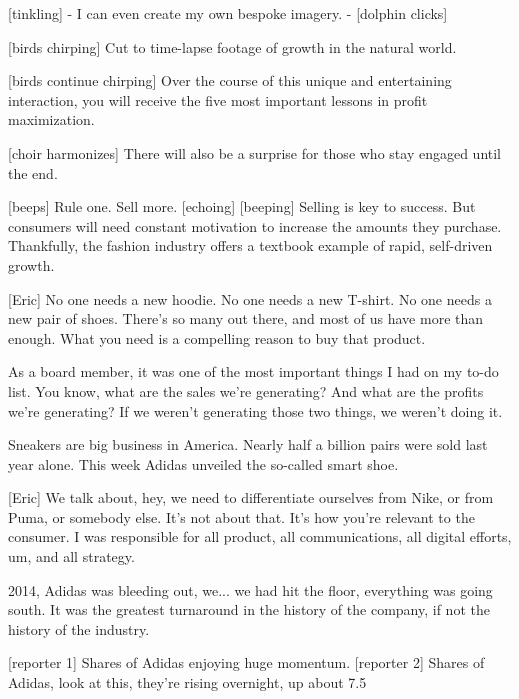 \documentclass[a4paper]{article}
\begin{document}
	
	
	
	
	[tinkling]
	- I can even create my own bespoke imagery. 
	- [dolphin clicks]
	
	
	[birds chirping]
	Cut to time-lapse footage of growth in the natural world.
	
	
	[birds continue chirping]
	Over the course of this unique and entertaining interaction, you will receive the five most important lessons in profit maximization.
	
	
	
	[choir harmonizes]
	There will also be a surprise for those who stay engaged until the end.
	
	
	
	[beeps]
	Rule one.
	Sell more. [echoing]
	[beeping]
	Selling is key to success. But consumers will need constant motivation to increase the amounts they purchase.
	Thankfully, the fashion industry offers a textbook example of rapid, self-driven growth.
	
	
	
	
	[Eric] No one needs a new hoodie. No one needs a new T-shirt. No one needs a new pair of shoes. There's so many out there, and most of us have more than enough. What you need is a compelling reason to buy that product.
	
	
	
	
	As a board member, it was one of the most important things I had on my to-do list.
	You know, what are the sales we're generating?
	And what are the profits we're generating?
	If we weren't generating those two things, we weren't doing it.
	
	
	
	
	Sneakers are big business in America. 
	Nearly half a billion pairs were sold last year alone. 
	This week Adidas unveiled the so-called smart shoe.
	
	
	
	[Eric] We talk about, hey, we need to differentiate ourselves from Nike, or from Puma, or somebody else. It's not about that.
	It's how you're relevant to the consumer. I was responsible for all product, all communications, all digital efforts, um, and all strategy.
	
	
	
	2014, Adidas was bleeding out, we... we had hit the floor, everything was going south.
	It was the greatest turnaround in the history of the company, if not the history of the industry.



	[reporter 1] Shares of Adidas enjoying huge momentum.
	[reporter 2] Shares of Adidas, look at this, they're rising overnight, up about 7.5%
	
\end{document}
